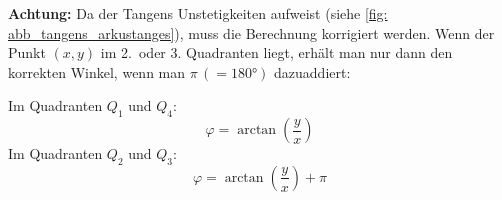 \textbf{Achtung:} Da der Tangens Unstetigkeiten aufweist (siehe \cref{fig: abb_tangens_arkustanges}), muss die Berechnung korrigiert werden. Wenn der Punkt $(x, y)$ im 2.\ oder 3. Quadranten liegt, erhält man nur dann den korrekten Winkel, wenn man $\pi\, (=\ang{180})$ dazuaddiert:
\begin{rememberbox}[sidebyside, sidebyside align=center, lower separated=false]{}
    Im Quadranten $Q_1$ und $Q_4$:
    \begin{equation}
        \varphi = \arctan\left(\frac{y}{x}\right)
    \end{equation}
    \tcblower
    Im Quadranten $Q_2$ und $Q_3$: 
    \begin{equation}
        \varphi = \arctan\left(\frac{y}{x}\right) + \pi
    \end{equation}
\end{rememberbox}
